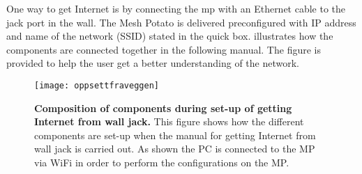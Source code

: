 One way to get Internet is by connecting the \gls{mp} with an Ethernet cable to the jack port in the wall. The Mesh Potato is delivered preconfigured with IP address and name of the network (SSID) stated in the \gls{quick} box.  illustrates how the components are connected together in the following manual. The figure is provided to help the user get a better understanding of the network.  

\begin{figure}[h!]
  \centering
      \texttt{[image: oppsettfraveggen]}
  \caption [Composition of components during set-up of getting Internet from wall jack]{\textbf{Composition of components during set-up of getting Internet from wall jack.} This figure shows how the different components are set-up when the manual for getting Internet from wall jack is carried out. As shown the PC is connected to the MP via WiFi in order to perform the configurations on the MP.}
  \label{fig:oppsettfraveggen}
\end{figure}



